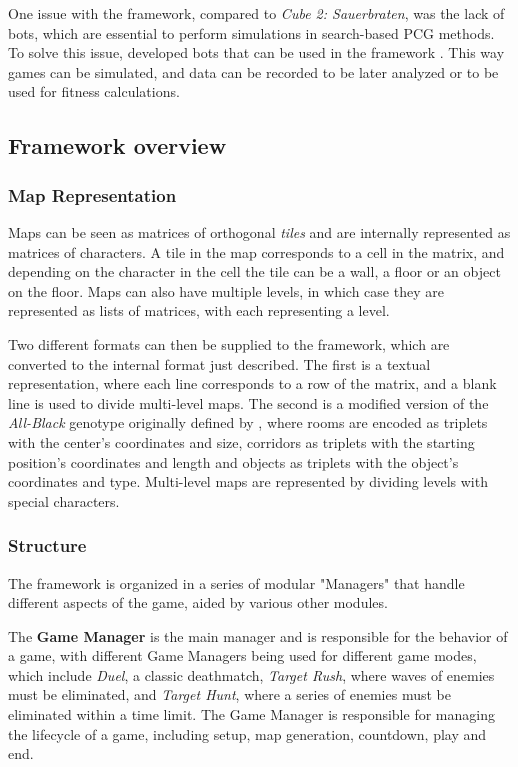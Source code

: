 One issue with the framework, compared to \textit{Cube 2: Sauerbraten}, was the lack of bots, which are essential to perform simulations in search-based PCG methods. To solve this issue, \citeauthor{bari_evolutionary-based_2023} developed bots that can be used in the framework \cite{bari_evolutionary-based_2023}. This way games can be simulated, and data can be recorded to be later analyzed or to be used for fitness calculations.

\subsection{Framework overview}
\label{sec:pa_overview}

\subsubsection{Map Representation}
\label{subsec:map_representation}

Maps can be seen as matrices of orthogonal \textit{tiles} and are internally represented as matrices of characters. A tile in the map corresponds to a cell in the matrix, and depending on the character in the cell the tile can be a wall, a floor or an object on the floor. Maps can also have multiple levels, in which case they are represented as lists of matrices, with each representing a level.

Two different formats can then be supplied to the framework, which are converted to the internal format just described. The first is a textual representation, where each line corresponds to a row of the matrix, and a blank line is used to divide multi-level maps. The second is a modified version of the \textit{All-Black} genotype originally defined by \citeauthor{cardamone_evolving_2011}, where rooms are encoded as triplets with the center's coordinates and size, corridors as triplets with the starting position's coordinates and length and objects as triplets with the object's coordinates and type. Multi-level maps are represented by dividing levels with special characters.

\subsubsection{Structure}
\label{subsec:structure}
The framework is organized in a series of modular "Managers" that handle different aspects of the game, aided by various other modules.

The \textbf{Game Manager} is the main manager and is responsible for the behavior of a game, with different Game Managers being used for different game modes, which include \textit{Duel}, a classic deathmatch, \textit{Target Rush}, where waves of enemies must be eliminated, and \textit{Target Hunt}, where a series of enemies must be eliminated within a time limit. The Game Manager is responsible for managing the lifecycle of a game, including setup, map generation, countdown, play and end.

